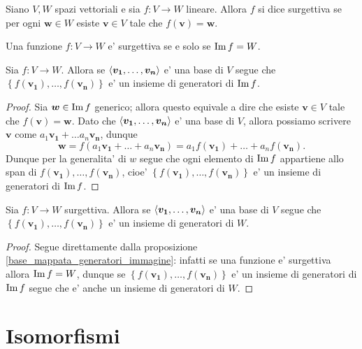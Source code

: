 \begin{definition}
    Siano $V, W$ spazi vettoriali e sia $f : V \to W$ lineare. Allora $f$ si dice surgettiva se per ogni $\bm{w} \in W$ esiste $\bm{v} \in V$ tale che $f(\bm{v}) = \bm{w}$.
\end{definition}

\begin{remark}
    Una funzione $f : V \to W$ e' surgettiva se e solo se $\operatorname{Im}f = W$.
\end{remark}

\begin{proposition}\label{base_mappata_generatori_immagine}
    Sia $f : V \to W$. Allora se $\left\langle \bm{v_1}, \dots, \bm{v_n} \right\rangle$ e' una base di $V$ segue che $\left\{ f(\bm{v_1}), \dots, f(\bm{v_n})\right\}$ e' un insieme di generatori di $\operatorname{Im}f$.
\end{proposition}
\begin{proof}
    Sia $\bm{w} \in \operatorname{Im}f$ generico; allora questo equivale a dire che esiste $\bm{v} \in V$ tale che $f(\bm{v}) = \bm{w}$.
    Dato che $\left\langle \bm{v_1}, \dots, \bm{v_n} \right\rangle$ e' una base di $V$, allora possiamo scrivere $\bm{v}$ come $a_1\bm{v_1} + \dots a_n\bm{v_n}$, dunque 
    \begin{equation*}
        \bm{w} = f(a_1\bm{v_1} + \dots + a_n\bm{v_n}) = a_1f(\bm{v_1}) + \dots + a_nf(\bm{v_n}).
    \end{equation*}
    Dunque per la generalita' di $w$ segue che ogni elemento di $\operatorname{Im}f$ appartiene allo span di $f(\bm{v_1}), \dots, f(\bm{v_n})$, cioe' $\left\{ f(\bm{v_1}), \dots, f(\bm{v_n})\right\}$ e' un insieme di generatori di $\operatorname{Im}f$.
\end{proof}

\begin{corollary}\label{base_mappata_generatori_codominio}
    Sia $f : V \to W$ surgettiva. Allora se $\left\langle \bm{v_1}, \dots, \bm{v_n} \right\rangle$ e' una base di $V$ segue che $\left\{ f(\bm{v_1}), \dots, f(\bm{v_n})\right\}$ e' un insieme di generatori di $W$.
\end{corollary}
\begin{proof}
    Segue direttamente dalla proposizione \ref{base_mappata_generatori_immagine}: infatti se una funzione e' surgettiva allora $\operatorname{Im}f = W$, dunque se $\left\{ f(\bm{v_1}), \dots, f(\bm{v_n})\right\}$ e' un insieme di generatori di $\operatorname{Im}f$ segue che e' anche un insieme di generatori di $W$.
\end{proof}

\section{Isomorfismi}


